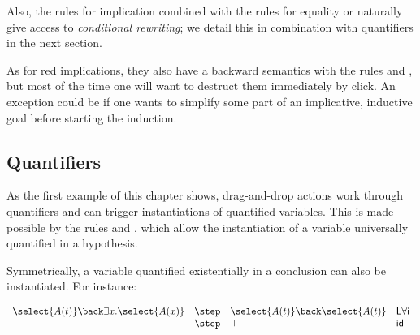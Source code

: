 Also, the rules for implication combined with the rules for equality
 or  naturally give access to {\em
  conditional rewriting}; we detail this in combination with
quantifiers in the next section.



As for red implications, they also have a backward semantics with the rules
 and , but most of the time one
will want to destruct them immediately by click. An exception could be if one
wants to simplify some part of an implicative, inductive goal before starting
the induction.

\subsection{Quantifiers}
As the first example of this chapter shows, drag-and-drop actions work through
quantifiers and can trigger instantiations of quantified variables. This is made
possible by the rules  and , which allow the
instantiation of a variable universally quantified in a hypothesis.

Symmetrically, a variable quantified existentially in a conclusion can
also be instantiated. For instance:

$$\begin{array}{llll}
    \select{A(t)}\back \exists x.\select{A(x)}&\step&
                                                      \select{A(t)}\back\select{A(t)}&\mathsf{L}\forall\mathsf{i}
    \\
                                               &\step& \top&\mathsf{id}
  \end{array}
  $$

